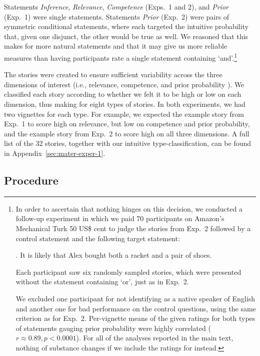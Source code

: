 \documentclass[12pt]{article}
\begin{document}
\noindent Statements \emph{Inference}, \emph{Relevance}, \emph{Competence} (Exps.\ 1 and 2), and \emph{Prior}  (Exp.\ 1) were single statements. Statements \emph{Prior} (Exp.\ 2) were pairs of symmetric conditional statements, where each targeted the intuitive probability that, given one disjunct, the other would be true as well. We reasoned that this makes for more natural statements and that it may give us more reliable measures than having participants rate a single statement containing `and'.\footnote{In order to ascertain that nothing hinges on this decision, we conducted a follow-up experiment in which we paid 70 participants on Amazon's Mechanical Turk 50 US\$ cent to judge the stories from Exp.\ 2 followed by a control statement and the following target statement:

\ex.	It is likely that Alex bought both a racket and a pair of shoes.

Each participant saw six randomly sampled stories, which were presented without the statement containing `or', just as in Exp.\ 2.

We excluded one participant for not identifying as a native speaker of English and another one for bad performance on the control questions, using the same criterion as for
Exp.\ 2. Per-vignette means of the given ratings for both types of statements gauging prior probability were highly correlated ($r \approx 0.89, p < 0.0001$). For all of the analyses reported in the main text, nothing of substance changes if we include the ratings for \Last instead.}

The stories were created to ensure sufficient variability across the three dimensions of
interest (i.e., relevance, competence, and prior probability ). We classified each story according to whether we felt it to be high or low on each dimension, thus making for eight types of stories. In both experiments, we had two vignettes for each type. For example, we expected the example story from Exp.\ 1 to score high on relevance, but low on competence and prior probability, and the example story from Exp.\ 2 to score high on all three dimensions. A full list of the 32 stories, together with our intuitive type-classification, can be found in Appendix~\ref{sec:mater-exper-1}. 

\subsection*{Procedure}
\end{document}
